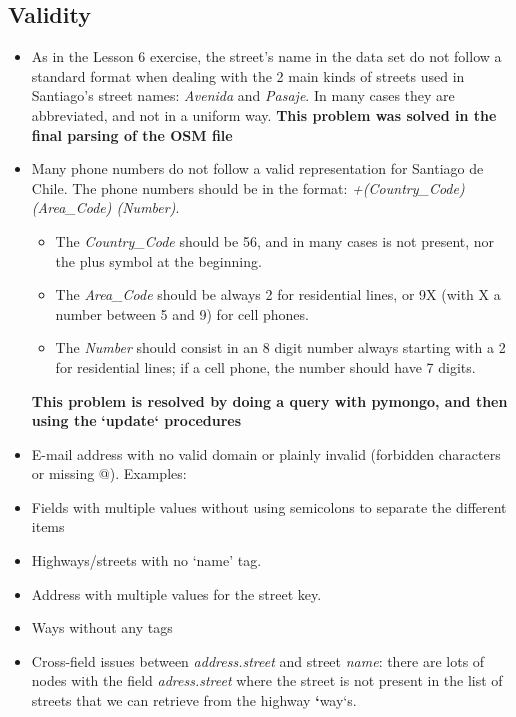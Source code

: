 \documentclass[a4paper,10pt,english]{sphinxhowto}
\begin{document}
\subsection{Validity}
\label{index:validity}\begin{itemize}
\item {} 
As in the Lesson 6 exercise, the street's name in the data set do not follow
a standard format when dealing with the 2 main kinds of streets used in Santiago's
street names: \emph{Avenida} and \emph{Pasaje}. In many cases they are abbreviated, and not
in a uniform way. \textbf{This problem was solved in the final parsing of the OSM file}

\item {} 
Many phone numbers do not follow a valid representation for Santiago de Chile.
The phone numbers should be in the format: \emph{+(Country\_Code) (Area\_Code) (Number)}.
\begin{itemize}
\item {} 
The \emph{Country\_Code} should be 56, and in many cases is not present, nor the plus
symbol at the beginning.

\item {} 
The \emph{Area\_Code} should be always 2 for residential lines, or 9X (with X a
number between 5 and 9) for cell phones.

\item {} 
The \emph{Number} should consist in an 8 digit number always starting with a 2
for residential lines; if a cell phone, the number should have 7 digits.

\end{itemize}

\textbf{This problem is resolved by doing a query with pymongo, and then using the}
\textbf{{}`update{}` procedures}

\item {} 
E-mail address with no valid domain or plainly invalid (forbidden characters or
missing @). Examples:

\item {} 
Fields with multiple values without using semicolons to separate the different
items

\item {} 
Highways/streets with no `name' tag.

\item {} 
Address with multiple values for the street key.

\item {} 
Ways without any tags

\item {} 
Cross-field issues between \emph{address.street} and street \emph{name}: there are lots
of nodes with the field \emph{adress.street} where the street is not present in the
list of streets that we can retrieve from the highway {\color{red}\bfseries{}{}`}way{}`s.

\end{itemize}
\end{document}
